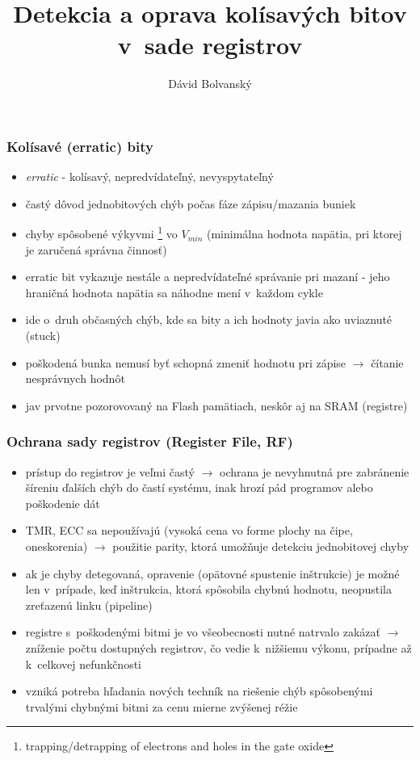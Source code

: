 \documentclass{beamer}
\begin{document}
	
\title[Detekcia a oprava kolísavých bitov v~RF]{Detekcia a oprava kolísavých bitov v~sade registrov}
\author{Dávid Bolvanský}
\date{}

	
\frame[plain]{\titlepage}

\begin{frame}\frametitle{Kolísavé (erratic) bity}
\begin{itemize}
	\item \textit{erratic} \-- kolísavý, nepredvídateľný, nevyspytateľný
	\item častý dôvod jednobitových chýb počas fáze zápisu/mazania buniek
	\item chyby spôsobené výkyvmi \footnote{trapping/detrapping of electrons and holes in the gate oxide} vo $V_{min}$ (minimálna hodnota napätia, pri ktorej je zaručená správna činnosť)
	\item erratic bit vykazuje nestále a nepredvídateľné správanie pri mazaní \-- jeho hraničná hodnota napätia sa náhodne mení v~každom cykle
	\item ide o~druh občasných chýb, kde sa bity a ich hodnoty javia ako uviaznuté (stuck) 
	\item poškodená bunka nemusí byť schopná zmeniť hodnotu pri zápise $\rightarrow$ čítanie nesprávnych hodnôt
	\item jav prvotne pozorovovaný na Flash pamätiach, neskôr aj na SRAM (registre)
\end{itemize}
\end{frame}

\begin{frame}\frametitle{Ochrana sady registrov (Register File, RF)}
\begin{itemize}
	\item prístup do registrov je veľmi častý $\rightarrow$ ochrana je nevyhnutná pre zabránenie šíreniu ďalších chýb do častí systému, inak hrozí pád programov alebo poškodenie dát
	\item TMR, ECC sa nepoužívajú (vysoká cena vo forme plochy na čipe, oneskorenia) $\rightarrow$ použitie parity, ktorá umožňuje detekciu jednobitovej chyby
	\item ak je chyby detegovaná, opravenie (opätovné spustenie inštrukcie) je možné len v~prípade, keď inštrukcia, ktorá spôsobila chybnú hodnotu, neopustila zreťazenú linku (pipeline) 
	\item registre s~poškodenými bitmi je vo všeobecnosti nutné natrvalo zakázať $\rightarrow$ zníženie počtu dostupných registrov, čo vedie k~nižšiemu výkonu, prípadne až k~celkovej nefunkčnosti
	\item vzniká potreba hľadania nových techník na riešenie chýb spôsobenými trvalými chybnými bitmi za cenu mierne zvýšenej réžie
\end{itemize}
\end{frame}
\end{document}
